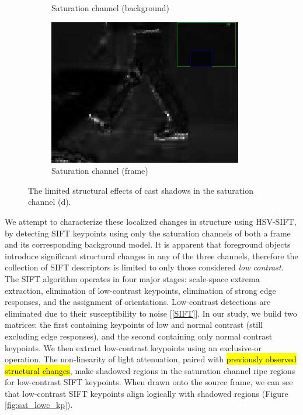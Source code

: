 \documentclass[12pt]{report}
\begin{document}
\begin{figure}
\begin{subfigure}{.49\linewidth}
  \caption{Saturation channel (background)}
\end{subfigure}
\hfill
\begin{subfigure}{.49\linewidth}
 \includegraphics[width=1\linewidth]{figures/lab_sat_fg_zoom_0161.jpg}
  \caption{Saturation channel (frame)}
\end{subfigure}

\caption{The limited structural effects of cast shadows in the saturation channel (d).}
\label{fig:sat_struct}
\end{figure}

We attempt to characterize these localized changes in structure using HSV-SIFT, by detecting SIFT keypoints using only the saturation channels of both a frame and its corresponding background model. It is apparent that foreground objects introduce significant structural changes in any of the three channels, therefore the collection of SIFT descriptors is limited to only those considered \textit{low contrast}. The SIFT algorithm operates in four major stages: scale-space extrema extraction, elimination of low-contrast keypoints, elimination of strong edge responses, and the assignment of orientations. Low-contrast detections are eliminated due to their susceptibility to noise [\ref{SIFT}]. In our study, we build two matrices: the first containing keypoints of low and normal contrast (still excluding edge responses), and the second containing only normal contrast keypoints. We then extract low-contrast keypoints using an exclusive-or operation. The non-linearity of light attenuation, paired with \hl{previously observed structural changes}, make shadowed regions in the saturation channel ripe regions for low-contrast SIFT keypoints. When drawn onto the source frame, we can see that low-contrast SIFT keypoints align logically with shadowed regions (Figure \ref{fig:sat_lowc_kp}). 
\end{document}
